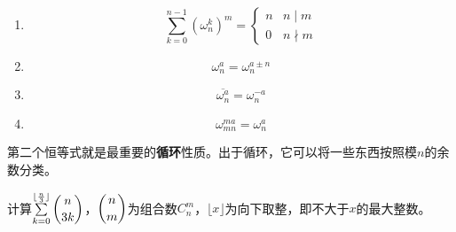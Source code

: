                 \begin{proposition}[单位根恒等式]
                    \begin{enumerate}
                        \item
                            \begin{equation}
                                \label{eq:unit_root_identity1}
                                \sum_{k=0}^{n-1}(\omega_n^{k})^{m}=
                                \begin{cases}
                                    n & n \mid m \\
                                    0 & n \nmid m
                                \end{cases}
                                \nonumber
                            \end{equation}
                        \item
                            \begin{equation}
                                \label{eq:unit_root_identity2}
                                \omega_n^{a}=\omega_n^{a\pm n}
                                \nonumber
                            \end{equation}
                        \item
                            \begin{equation}
                                \label{eq:unit_root_identity3}
                                \overline{\omega_n^{a}}=\omega_n^{-a}
                                \nonumber
                            \end{equation}
                        \item
                            \begin{equation}
                                \label{eq:unit_root_identity4}
                                \omega_{mn}^{ma}=\omega_n^{a}
                                \nonumber
                            \end{equation}
                    \end{enumerate}
                \end{proposition}

                第二个恒等式就是最重要的\textbf{循环}性质。出于循环，它可以将一些东西按照模$n$的余数分类。

                \begin{example}
                    计算$\sum\limits_{k=0}^{\lfloor \frac{n}{3} \rfloor}\dbinom{n}{3k}$，$\dbinom{n}{m}$为组合数$C_n^{m}$，$\lfloor x\rfloor$为向下取整，即不大于$x$的最大整数。
                \end{example}

